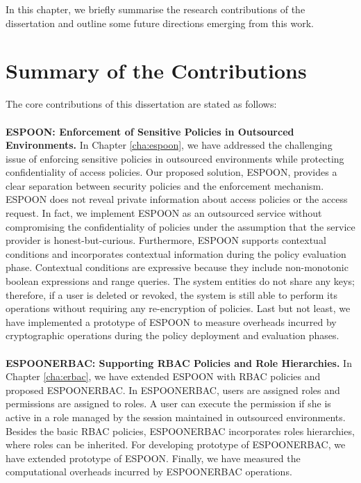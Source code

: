 \documentclass[epsfig,a4paper,11pt,titlepage]{book}
\numberwithin{algorithm}{chapter}
\begin{document}
In this chapter, we briefly summarise the research contributions of the dissertation and outline some future directions emerging from this work.

\section{Summary of the Contributions}
The core contributions of this dissertation are stated as follows: \\ \\
\noindent \textbf{\gls{ESPOON}: Enforcement of Sensitive Policies in Outsourced Environments.}
In Chapter \ref{cha:espoon}, we have addressed the challenging issue of enforcing sensitive policies in outsourced environments while protecting confidentiality of access policies. Our proposed solution, \gls{ESPOON}, provides a clear separation between security policies and the enforcement mechanism. \gls{ESPOON} does not reveal private information about access policies or the access request. In fact, we implement \gls{ESPOON} as an outsourced service without compromising the confidentiality of policies under the assumption that the service provider is honest-but-curious. Furthermore, \gls{ESPOON} supports contextual conditions and incorporates contextual information during the policy evaluation phase. Contextual conditions are expressive because they include non-monotonic boolean expressions and range queries. The system entities do not share any keys; therefore, if a user is deleted or revoked, the system is still able to perform its operations without requiring any re-encryption of policies. Last but not least, we have implemented a prototype of \gls{ESPOON} to measure overheads incurred by cryptographic operations during the policy deployment and evaluation phases. \\ \\
\noindent \textbf{\gls{ESPOONERBAC}: Supporting \gls{RBAC} Policies and Role Hierarchies.}
In Chapter \ref{cha:erbac}, we have extended \gls{ESPOON} with \gls{RBAC} policies and proposed \gls{ESPOONERBAC}. In \gls{ESPOONERBAC}, users are assigned roles and permissions are assigned to roles. A user can execute the permission if she is active in a role managed by the session maintained in outsourced environments. Besides the basic \gls{RBAC} policies, \gls{ESPOONERBAC} incorporates roles hierarchies, where roles can be inherited. For developing prototype of \gls{ESPOONERBAC}, we have extended prototype of \gls{ESPOON}. Finally, we have measured the computational overheads incurred by \gls{ESPOONERBAC} operations. \\ \\
\end{document}
